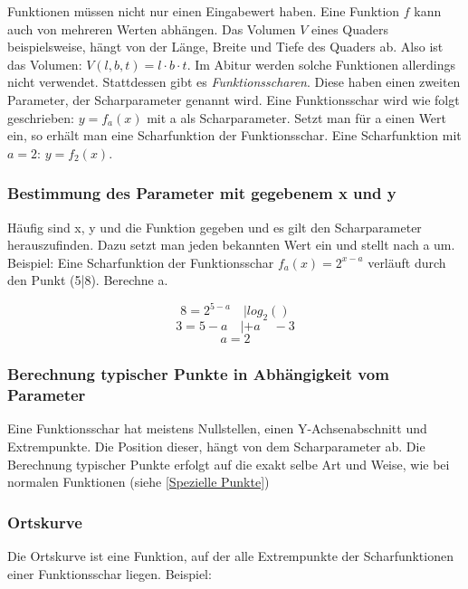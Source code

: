 \documentclass{article}
\begin{document}
Funktionen müssen nicht nur einen Eingabewert haben. Eine Funktion $f$ kann auch von mehreren Werten abhängen.
Das Volumen $V$ eines Quaders beispielsweise, hängt von der Länge, Breite und Tiefe des Quaders ab.
Also ist das Volumen: $V(l,b,t)=l \cdot b \cdot t$. Im Abitur werden solche Funktionen allerdings nicht verwendet.
Stattdessen gibt es \emph{Funktionsscharen}. Diese haben einen zweiten Parameter, der Scharparameter genannt wird.
Eine Funktionsschar wird wie folgt geschrieben: $y=f_a(x)$ mit a als Scharparameter. Setzt man für a einen Wert ein,
so erhält man eine Scharfunktion der Funktionsschar. Eine Scharfunktion mit $a=2$: $y=f_2(x)$.

\subsubsection{Bestimmung des Parameter mit gegebenem x und y}
Häufig sind x, y und die Funktion gegeben und es gilt den Scharparameter herauszufinden. Dazu setzt man jeden bekannten
Wert ein und stellt nach a um. Beispiel: Eine Scharfunktion der Funktionsschar $f_a(x)=2^{x-a}$
verläuft durch den Punkt (5|8). Berechne a.

\[ 8=2^{5-a} \quad | log_2() \]
\[ 3=5-a \quad | +a \quad -3 \]
\[ a=2 \]

\subsubsection{Berechnung typischer Punkte in Abhängigkeit vom Parameter}
Eine Funktionsschar hat meistens Nullstellen, einen Y-Achsenabschnitt und Extrempunkte. Die Position dieser,
hängt von dem Scharparameter ab. Die Berechnung typischer Punkte erfolgt auf die exakt selbe Art und Weise,
wie bei normalen Funktionen (siehe \ref{Spezielle Punkte})

\subsubsection{Ortskurve}

Die Ortskurve ist eine Funktion, auf der alle Extrempunkte der Scharfunktionen einer Funktionsschar liegen. Beispiel:
\end{document}
